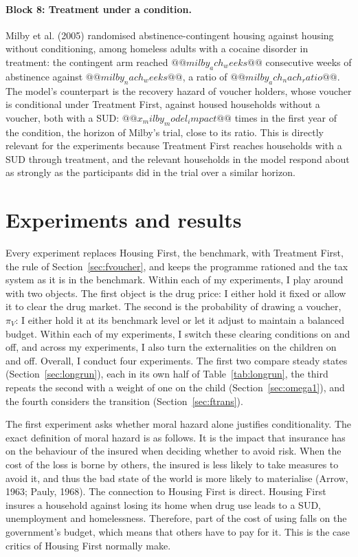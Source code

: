 \documentclass[10pt]{article}
\begin{document}
 \paragraph{Block 8:  Treatment under a condition.}
  Milby et al. (2005)  randomised abstinence-contingent housing against housing without conditioning, among homeless adults with a cocaine disorder in treatment: the contingent arm reached $@@milby_ach_weeks@@$ consecutive weeks of abstinence against $@@milby_nach_weeks@@$, a ratio of $@@milby_ach_nach_ratio@@$. The model's counterpart is the recovery hazard of voucher holders, whose voucher is conditional under Treatment First, against housed households without a voucher, both with a SUD: $@@x_milby_model_impact@@$ times in the first year of the condition, the horizon of Milby's trial, close to its ratio.   This is directly relevant for the experiments because Treatment First reaches households with a SUD through treatment, and the relevant households in the model respond about as strongly as the participants did in the trial over a similar horizon.






\section{Experiments and results}\label{sec:experiments}

Every experiment replaces Housing First, the benchmark, with Treatment First, the rule of Section~\ref{sec:fvoucher}, and keeps the programme rationed and the tax system as it is in the benchmark.     Within each of my experiments, I play around with two objects. The first object is the drug price: I either hold it fixed or allow it to clear the drug market. The second is the probability of drawing a voucher, $\pi_V$: I either hold it at its benchmark level or let it adjust to maintain a balanced budget. Within each of my experiments, I switch these clearing conditions on and off, and across my experiments, I also turn the externalities on the children on and off.  Overall, I conduct  four experiments. The first two compare steady states (Section~\ref{sec:longrun}), each in its own half of Table~\ref{tab:longrun}, the third repeats the second with a weight of one on the child (Section~\ref{sec:omega1}), and the  fourth considers the transition (Section~\ref{sec:ftrans}).

The first experiment asks whether moral hazard alone justifies conditionality.   The exact definition of moral hazard is as follows. It is the impact that insurance has on the behaviour of the insured when deciding whether to avoid risk. When the cost of the loss is borne by others, the insured is less likely to take measures to avoid it, and thus the bad state of the world is more likely to materialise (Arrow, 1963; Pauly, 1968). The connection to Housing First is direct. Housing First insures a household against losing its home when drug use leads to a SUD, unemployment and homelessness. Therefore, part of the cost of using falls on the government's budget, which means that others have to pay for it. This is the case critics of Housing First normally make.
\end{document}
